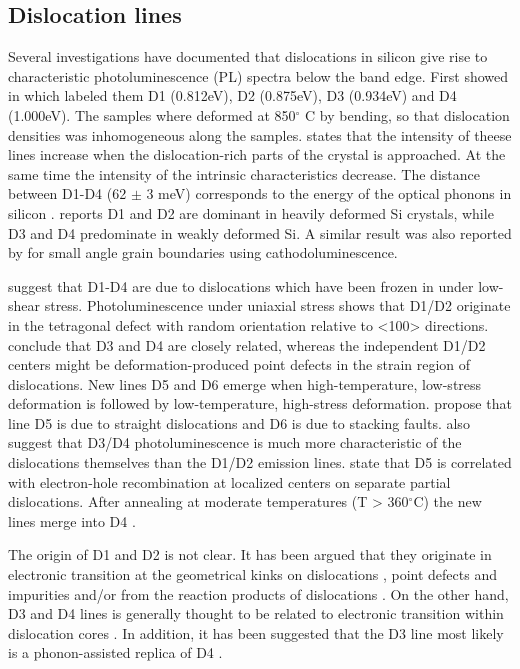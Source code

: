 \subsection{Dislocation lines}

Several investigations have documented that dislocations in silicon give rise to characteristic photoluminescence (PL) spectra below the band edge. First showed in \cite{drozdov76} which labeled them D1 (0.812eV), D2 (0.875eV), D3 (0.934eV) and D4 (1.000eV). The samples where deformed at 850$^\circ$ C by bending, so that dislocation densities was inhomogeneous along the samples. \cite{drozdov76} states that the intensity of theese lines increase when the dislocation-rich parts of the crystal is approached. At the same time the intensity of the intrinsic characteristics decrease. The distance between D1-D4 (62 $\pm$ 3 meV) corresponds to the energy of the optical phonons in silicon \cite{drozdov76}. \cite{drozdov76} reports D1 and D2 are dominant in heavily deformed Si crystals, while D3 and D4 predominate in weakly deformed Si. A similar result was also reported by \cite{lee09} for small angle grain boundaries using cathodoluminescence.

\cite{sauer85} suggest that D1-D4 are due to dislocations which have been frozen in under low-shear stress. Photoluminescence under uniaxial stress shows that D1/D2 originate in the tetragonal defect with random orientation relative to <100> directions. \cite{sauer85} conclude that D3 and D4 are closely related, whereas the independent D1/D2 centers might be deformation-produced point defects in the strain region of dislocations. New lines D5 and D6 emerge when high-temperature, low-stress deformation is followed by low-temperature, high-stress deformation. \cite{sauer85} propose that line D5 is due to straight dislocations and D6 is due to stacking faults. \cite{sauer85} also suggest that D3/D4 photoluminescence is much more characteristic of the dislocations themselves than the D1/D2 emission lines. \cite{weronek91} state that D5 is correlated with electron-hole recombination at localized centers on separate partial dislocations. After annealing at moderate temperatures (T > 360$^\circ$C) the new lines merge into D4 \cite{weronek91}.


The origin of D1 and D2 is not clear. It has been argued that they originate in electronic transition at the geometrical kinks on dislocations \cite{suezawa83}, point defects \cite{sauer85} and impurities \cite{higgs91} and/or from the reaction products of dislocations \cite{sekiguchi95}. On the other hand, D3 and D4 lines is generally thought to be related to electronic transition within dislocation cores \cite{kveder95}. In addition, it has been suggested that the D3 line most likely is a phonon-assisted replica of D4 \cite{kveder95}.


